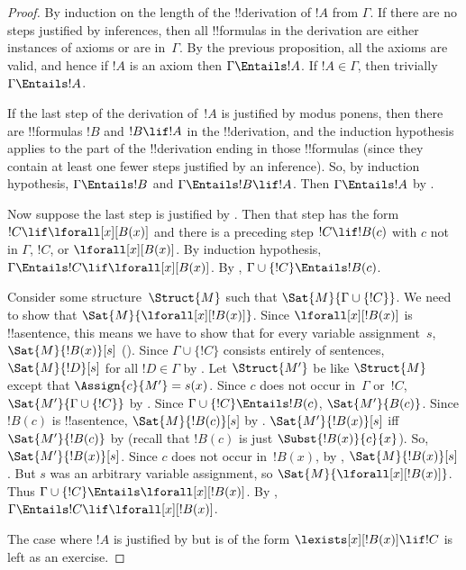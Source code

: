 \documentclass[../../include/open-logic-section]{subfiles}
\begin{document}
\begin{proof}
By induction on the length of the !!{derivation} of $!A$ from
$\Gamma$. If there are no steps justified by inferences, then all
!!{formula}s in the derivation are either instances of axioms or are
in~$\Gamma$. By the previous proposition, all the axioms are valid,
and hence if $!A$ is an axiom then $\Gamma \Entails !A$. If $!A \in
\Gamma$, then trivially $\Gamma \Entails !A$.

If the last step of the derivation of~$!A$ is justified by modus ponens,
then there are !!{formula}s $!B$ and $!B \lif !A$ in the
!!{derivation}, and the induction hypothesis applies to the part of
the !!{derivation} ending in those !!{formula}s (since they contain at
least one fewer steps justified by an inference).  So, by induction
hypothesis, $\Gamma \Entails !B$ and $\Gamma \Entails !B \lif !A$. Then
$\Gamma \Entails !A$ by .

Now suppose the last step is justified by
\QR. Then that step has the form $!C \lif \lforall[x][B(x)]$ and
there is a preceding step $!C \lif !B(c)$ with $c$ not in $\Gamma$,
$!C$, or $\lforall[x][B(x)]$. By induction hypothesis, $\Gamma
\Entails !C \lif \lforall[x][B(x)]$. By
, $\Gamma \cup \{!C\} \Entails
!B(c)$.

Consider some structure~$\Struct{M}$ such that $\Sat{M}{\Gamma \cup
  \{!C\}}$.  We need to show that $\Sat{M}{\lforall[x][!B(x)]}$. Since
$\lforall[x][!B(x)]$ is !!a{sentence}, this means we have to show that
for every variable assignment~$s$, $\Sat{M}{!B(x)}[s]$
(). Since $\Gamma \cup \{!C\}$
consists entirely of sentences, $\Sat{M}{!D}[s]$ for all $!D \in
\Gamma$ by .  Let $\Struct{M'}$ be
like $\Struct{M}$ except that $\Assign{c}{M'} = s(x)$.  Since $c$ does
not occur in~$\Gamma$ or~$!C$, $\Sat{M'}{\Gamma \cup \{!C\}}$ by
. Since $\Gamma \cup \{!C\}
\Entails !B(c)$, $\Sat{M'}{B(c)}$.  Since $!B(c)$ is !!a{sentence},
$\Sat{M}{!B(c)}[s]$ by
. $\Sat{M'}{!B(x)}[s]$ iff
$\Sat{M'}{!B(c)}$ by  (recall that
$!B(c)$ is just $\Subst{!B(x)}{c}{x}$). So,
$\Sat{M'}{!B(x)}[s]$. Since $c$ does not occur in~$!B(x)$, by
, $\Sat{M}{!B(x)}[s]$. But $s$
was an arbitrary variable assignment, so
$\Sat{M}{\lforall[x][!B(x)]}$. Thus $\Gamma \cup \{!C\} \Entails
\lforall[x][!B(x)]$. By , $\Gamma
\Entails !C \lif \lforall[x][!B(x)]$.

The case where $!A$ is justified by \QR{} but is of the form
$\lexists[x][!B(x)] \lif !C$ is left as an exercise.
\end{proof}
\end{document}
